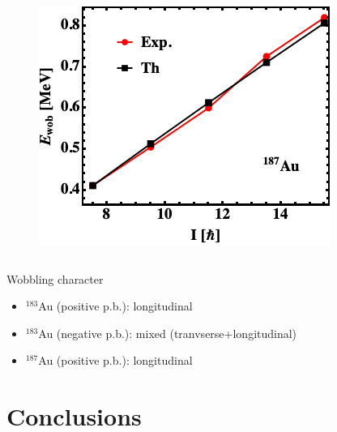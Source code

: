 \documentclass{beamer}
\begin{document}
\begin{frame}
\begin{columns}
\begin{column}{.33\textwidth}
\begin{figure}
        \centering
        \includegraphics[scale=0.3]{figs/wobbling_187.png}
    \end{figure}
    \end{column}
    \end{columns}
    \begin{alertblock}{Wobbling character}
    \begin{itemize}
        \item $^{183}$Au (positive p.b.): longitudinal
        \item $^{183}$Au (negative p.b.): mixed (tranvserse+longitudinal)
        \item $^{187}$Au (positive p.b.): longitudinal
    \end{itemize}
    \end{alertblock}
\end{frame}
\section{Conclusions}
\end{document}
